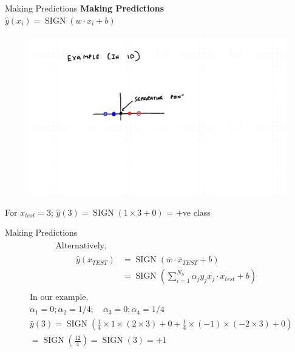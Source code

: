 \documentclass{beamer}
\begin{document}
\begin{frame}{Making Predictions}
\textbf{Making Predictions} \\
\hspace{2cm} $\hat{y}(x_i) = \operatorname{SIGN}(w \cdot x_i + b)$\\
\begin{figure}
\includegraphics[scale = 0.3]{SVM/Svm-21.pdf}
\end{figure}
For $x_{test} = 3$; $\hat{y}(3) = \operatorname{SIGN}(1 \times 3 + 0)$ = +ve class
\end{frame}

\begin{frame}{Making Predictions}\
\begin{align*}
\begin{array}{l}
{\text {Alternatively, }} \\
{\qquad \begin{aligned}
\hat{y}\left(x_{TEST}\right) &=\operatorname{SIGN}\left(\bar{w} \cdot \bar{x}_{TEST}+b\right) \\
&=\operatorname{SIGN} \left(\sum_{i=1}^{N_{S}} \alpha_{j} y_{j} x_{j} \cdot x_{test}+b\right)
\end{aligned}}
\end{array}
\end{align*}
\begin{align*}
\begin{aligned}
&\text{In our example,} \\
&\alpha_{1}=0 ; \alpha_{2}=1 / 4 ; \quad \alpha_{3}=0 ; \alpha_{4}=1 / 4\\
&\hat{y}(3) =\operatorname{SIGN}\left(\frac{1}{4} \times 1 \times (2 \times 3)+0+\frac{1}{4} \times (-1) \times (-2 \times 3)+0\right)\\
&=\operatorname{SIGN} \left(\frac{12}{4}\right)=\operatorname{SIGN}(3)=+1
\end{aligned}
\end{align*}

\end{frame}
\end{document}
